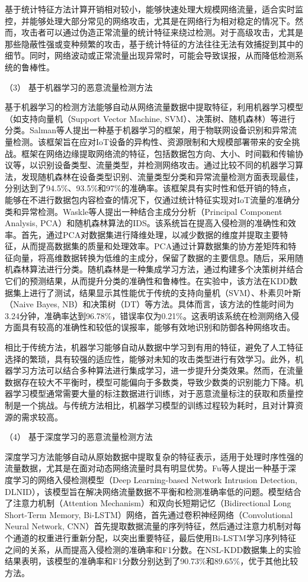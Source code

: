 \documentclass[promaster]{thesis-uestc}
\begin{document}
基于统计特征方法计算开销相对较小，能够快速处理大规模网络流量，适合实时监控，并能够处理大部分常见的网络攻击，尤其是在网络行为相对稳定的情况下。然而，攻击者可以通过伪造正常流量的统计特征来绕过检测。对于高级攻击，尤其是那些隐蔽性强或变种频繁的攻击，基于统计特征的方法往往无法有效捕捉到其中的细节。同时，网络波动或正常流量出现异常时，可能会导致误报，从而降低检测系统的鲁棒性。

（3） 基于机器学习的恶意流量检测方法  

   基于机器学习的检测方法能够自动从网络流量数据中提取特征，利用机器学习模型（如支持向量机（Support Vector Machine, SVM）、决策树、随机森林）等进行分类。Salman等人提出一种基于机器学习的框架，用于物联网设备识别和异常流量检测。该框架旨在应对IoT设备的异构性、资源限制和大规模部署带来的安全挑战。框架在网络边缘提取网络流的特征，包括数据包方向、大小、时间戳和传输协议等，以识别设备类型、流量类型，并检测网络攻击。通过比较不同的机器学习算法，发现随机森林在设备类型识别、流量类型分类和异常流量检测方面表现最佳，分别达到了94.5\%、93.5\%和97\%的准确率。该框架具有实时性和低开销的特点，能够在不进行数据包内容检查的情况下，仅通过统计特征实现对IoT流量的准确分类和异常检测。Waskle等人提出一种结合主成分分析（Principal Component Analysis, PCA）和随机森林算法的IDS。该系统旨在提高入侵检测的准确性和效率。首先，通过PCA对数据集进行降维处理，以减少数据的维度并提取主要特征，从而提高数据集的质量和处理效率。PCA通过计算数据集的协方差矩阵和特征向量，将高维数据转换为低维的主成分，保留了数据的主要信息。随后，采用随机森林算法进行分类。随机森林是一种集成学习方法，通过构建多个决策树并结合它们的预测结果，从而提升分类的准确性和鲁棒性。在实验中，该方法在KDD数据集上进行了测试，结果显示其性能优于传统的支持向量机（SVM）、朴素贝叶斯（Naive Bayes, NB）和决策树（DT）等方法。具体而言，该方法的性能时间为3.24分钟，准确率达到96.78\%，错误率仅为0.21\%。这表明该系统在检测网络入侵方面具有较高的准确性和较低的误报率，能够有效地识别和防御各种网络攻击。
   
相比于传统方法，机器学习能够自动从数据中学习到有用的特征，避免了人工特征选择的繁琐，具有较强的适应性，能够对未知的攻击类型进行有效学习。此外，机器学习方法可以结合多种算法进行集成学习，进一步提升分类效果。然而，在流量数据存在较大不平衡时，模型可能偏向于多数类，导致少数类的识别能力下降。机器学习模型通常需要大量的标注数据进行训练，对于恶意流量标注的获取和质量控制是一个挑战。与传统方法相比，机器学习模型的训练过程较为耗时，且对计算资源的需求较高。

（4） 基于深度学习的恶意流量检测方法  

   深度学习方法能够自动从原始数据中提取复杂的特征表示，适用于处理时序性强的流量数据，尤其是在面对动态网络流量时具有明显优势。Fu等人提出一种基于深度学习的网络入侵检测模型（Deep Learning-based Network Intrusion Detection, DLNID），该模型旨在解决网络流量数据不平衡和检测准确率低的问题。模型结合了注意力机制（Attention Mechanism）和双向长短期记忆（Bidirectional Long Short-Term Memory, Bi-LSTM）网络，首先通过卷积神经网络（Convolutional Neural Network, CNN）首先提取数据流量的序列特征，然后通过注意力机制对每个通道的权重进行重新分配，以突出重要特征，最后使用Bi-LSTM学习序列特征之间的关系，从而提高入侵检测的准确率和F1分数。在NSL-KDD数据集上的实验结果表明，该模型的准确率和F1分数分别达到了90.73\%和89.65\%，优于其他比较方法。
\end{document}
